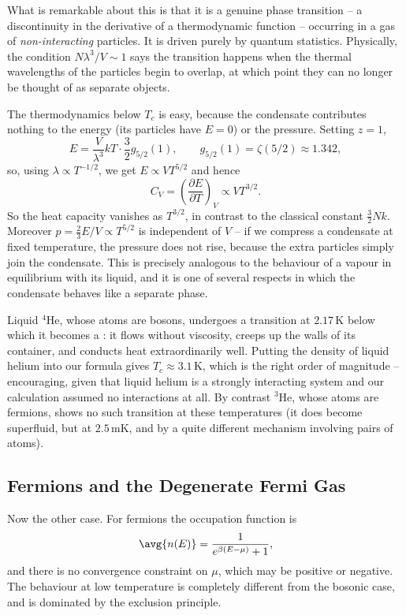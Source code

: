 What is remarkable about this is that it is a genuine phase transition -- a discontinuity in the derivative of a thermodynamic function -- occurring in a gas of \emph{non-interacting} particles. It is driven purely by quantum statistics. Physically, the condition $N\lambda^3/V \sim 1$ says the transition happens when the thermal wavelengths of the particles begin to overlap, at which point they can no longer be thought of as separate objects.

The thermodynamics below $T_c$ is easy, because the condensate contributes nothing to the energy (its particles have $E = 0$) or the pressure. Setting $z = 1$,
$$
E = \frac{V}{\lambda^3}kT\cdot \frac 32 g_{5/2}(1), \qquad g_{5/2}(1) = \zeta(5/2)\approx 1.342,
$$
so, using $\lambda \propto T^{-1/2}$, we get $E \propto V T^{5/2}$ and hence
$$
C_V = \left(\frac{\partial E}{\partial T}\right)_V \propto V T^{3/2}.
$$
So the heat capacity vanishes as $T^{3/2}$, in contrast to the classical constant $\tfrac 32 Nk$. Moreover $p = \tfrac 23 E/V \propto T^{5/2}$ is independent of $V$ -- if we compress a condensate at fixed temperature, the pressure does not rise, because the extra particles simply join the condensate. This is precisely analogous to the behaviour of a vapour in equilibrium with its liquid, and it is one of several respects in which the condensate behaves like a separate phase.

\begin{example}
	Liquid ${}^4$He, whose atoms are bosons, undergoes a transition at $2.17\,\mathrm{K}$ below which it becomes a : it flows without viscosity, creeps up the walls of its container, and conducts heat extraordinarily well. Putting the density of liquid helium into our formula gives $T_c \approx 3.1\,\mathrm{K}$, which is the right order of magnitude -- encouraging, given that liquid helium is a strongly interacting system and our calculation assumed no interactions at all. By contrast ${}^3$He, whose atoms are fermions, shows no such transition at these temperatures (it does become superfluid, but at $2.5\,\mathrm{mK}$, and by a quite different mechanism involving pairs of atoms).
\end{example}

\subsection{Fermions and the Degenerate Fermi Gas}\label{sec:fermi}

Now the other case. For fermions the occupation function is
$$
\avg{n(E)} = \frac{1}{e^{\beta(E-\mu)}+1},
$$
and there is no convergence constraint on $\mu$, which may be positive or negative. The behaviour at low temperature is completely different from the bosonic case, and is dominated by the exclusion principle.

